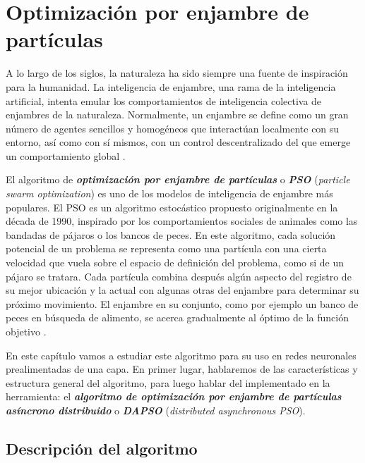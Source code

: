 
\chapter{Optimización por enjambre de partículas}\label{chap:pso}

A lo largo de los siglos, la naturaleza ha sido siempre una fuente de inspiración para la humanidad. La inteligencia
de enjambre, una rama de la inteligencia artificial, intenta emular los comportamientos de inteligencia colectiva de
enjambres de la naturaleza. Normalmente, un enjambre se define como un gran número de agentes sencillos y homogéneos
que interactúan localmente con su entorno, así como con sí mismos, con un control descentralizado del que emerge un
comportamiento global \cite{gad_2022}.

\vspace{10pt}
El algoritmo de \textbf{\textit{optimización por enjambre de partículas}} o \textbf{\textit{PSO}} 
(\textit{particle swarm optimization}) es uno de los modelos de inteligencia de enjambre más populares. El PSO es
un algoritmo estocástico propuesto originalmente en la década de 1990, inspirado por los comportamientos sociales de
animales como las bandadas de pájaros o los bancos de peces. En este algoritmo, cada solución potencial de un problema
se representa como una partícula con una cierta velocidad que vuela sobre el espacio de definición del problema, como
si de un pájaro se tratara. Cada partícula combina después algún aspecto del registro de su mejor ubicación y la actual
con algunas otras del enjambre para determinar su próximo movimiento. El enjambre en su conjunto, como por ejemplo un
banco de peces en búsqueda de alimento, se acerca gradualmente al óptimo de la función objetivo \cite{gad_2022}.

\vspace{10pt}
En este capítulo vamos a estudiar este algoritmo para su uso en redes neuronales prealimentadas de una capa. En primer
lugar, hablaremos de las características y estructura general del algoritmo, para luego hablar del implementado en la
herramienta: el \textbf{\textit{algoritmo de optimización por enjambre de partículas asíncrono distribuido}} o 
\textbf{\textit{DAPSO}} (\textit{distributed asynchronous PSO}).

\section{Descripción del algoritmo}

